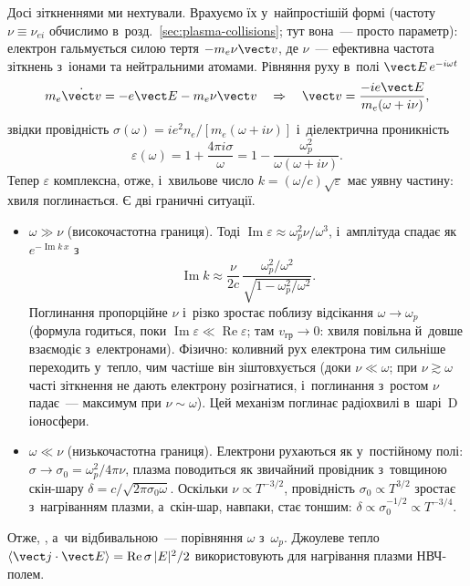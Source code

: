 Досі зіткненнями ми нехтували. Врахуємо їх у~найпростішій формі (частоту $\nu\equiv\nu_{ei}$ обчислимо в~розд.~\ref{sec:plasma-collisions}; тут вона~--- просто параметр): електрон гальмується
силою тертя $-m_e\nu\vect v$, де $\nu$~--- ефективна частота зіткнень з~іонами та
нейтральними атомами. Рівняння руху в~полі $\vect E\,e^{-i\omega t}$
\begin{equation*}
	m_e\dot{\vect v}=-e\vect E-m_e\nu\vect v
	\quad\Rightarrow\quad
	\vect v=\frac{-ie\vect E}{m_e(\omega+i\nu)},
\end{equation*}
звідки провідність $\sigma(\omega)=ie^2n_e/[m_e(\omega+i\nu)]$ і~діелектрична проникність
\begin{equation}\label{eq:eps-collisions-waves}
	\varepsilon(\omega)=1+\frac{4\pi i\sigma}{\omega}=1-\frac{\omega_p^2}{\omega(\omega+i\nu)}.
\end{equation}
Тепер $\varepsilon$ комплексна, отже, і~хвильове число $k=(\omega/c)\sqrt\varepsilon$ має
уявну частину: хвиля поглинається. Є дві граничні ситуації.
\begin{itemize}
	\item $\omega\gg\nu$ (високочастотна границя). Тоді
	  $\operatorname{Im}\varepsilon\approx\omega_p^2\nu/\omega^3$, і~амплітуда спадає як
	  $e^{-\operatorname{Im}k\,x}$ з
	  \begin{equation*}
	  	\operatorname{Im}k\approx\frac{\nu}{2c}\,\frac{\omega_p^2/\omega^2}{\sqrt{1-\omega_p^2/\omega^2}}.
	  \end{equation*}
	  Поглинання пропорційне $\nu$ і~різко зростає поблизу відсікання $\omega\to\omega_p$ (формула годиться, поки $\operatorname{Im}\varepsilon\ll\operatorname{Re}\varepsilon$; там $v_{\mathrm{гр}}\to0$: хвиля повільна й~довше взаємодіє з~електронами).
	  Фізично: коливний рух електрона тим сильніше переходить у~тепло, чим частіше він
	  зіштовхується (доки $\nu\ll\omega$; при $\nu\gtrsim\omega$ часті зіткнення не дають електрону
	  розігнатися, і~поглинання з~ростом $\nu$ падає~--- максимум при $\nu\sim\omega$). Цей механізм поглинає радіохвилі в~шарі~D іоносфери.
	\item $\omega\ll\nu$ (низькочастотна границя). Електрони рухаються як у~постійному
	  полі: $\sigma\to\sigma_0=\omega_p^2/4\pi\nu$, плазма поводиться як звичайний провідник
	  з~товщиною скін-шару $\delta=c/\sqrt{2\pi\sigma_0\omega}$. Оскільки $\nu\propto T^{-3/2}$,
	  провідність $\sigma_0\propto T^{3/2}$ зростає з~нагріванням плазми, а~скін-шар, навпаки,
	  стає тоншим: $\delta\propto\sigma_0^{-1/2}\propto T^{-3/4}$.
\end{itemize}
Отже, , а~чи
відбивальною~--- порівняння $\omega$ з~$\omega_p$. Джоулеве тепло $\langle\vect j\cdot\vect
E\rangle=\operatorname{Re}\sigma\,|E|^2/2$ використовують для нагрівання плазми
НВЧ-полем.

